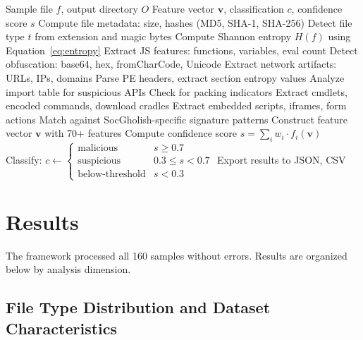 \documentclass[pdflatex,sn-mathphys-num]{sn-jnl}
\theoremstyle{thmstyleone}%
\theoremstyle{thmstyletwo}%
\theoremstyle{thmstylethree}%
\begin{document}
\begin{algorithm}
\caption{SocGholish Sample Analysis Procedure}\label{algo:analysis}
\begin{algorithmic}[1]
\Require Sample file $f$, output directory $O$
\Ensure Feature vector $\mathbf{v}$, classification $c$, confidence score $s$
\State Compute file metadata: size, hashes (MD5, SHA-1, SHA-256)
\State Detect file type $t$ from extension and magic bytes
\State Compute Shannon entropy $H(f)$ using Equation~\ref{eq:entropy}
    \State Extract JS features: functions, variables, eval count
    \State Detect obfuscation: base64, hex, fromCharCode, Unicode
    \State Extract network artifacts: URLs, IPs, domains
    \State Parse PE headers, extract section entropy values
    \State Analyze import table for suspicious APIs
    \State Check for packing indicators
    \State Extract cmdlets, encoded commands, download cradles
    \State Extract embedded scripts, iframes, form actions
\EndIf
\State Match against SocGholish-specific signature patterns
\State Construct feature vector $\mathbf{v}$ with 70+ features
\State Compute confidence score $s = \sum_{i} w_i \cdot f_i(\mathbf{v})$
\State Classify: $c \leftarrow \begin{cases} \text{malicious} & s \geq 0.7 \\ \text{suspicious} & 0.3 \leq s < 0.7 \\ \text{below-threshold} & s < 0.3 \end{cases}$
\State Export results to JSON, CSV
\end{algorithmic}
\end{algorithm}


\section{Results}\label{sec:results}

The framework processed all 160 samples without errors. Results are organized below by analysis dimension.

\subsection{File Type Distribution and Dataset Characteristics}\label{subsec:file_types}
\end{document}
